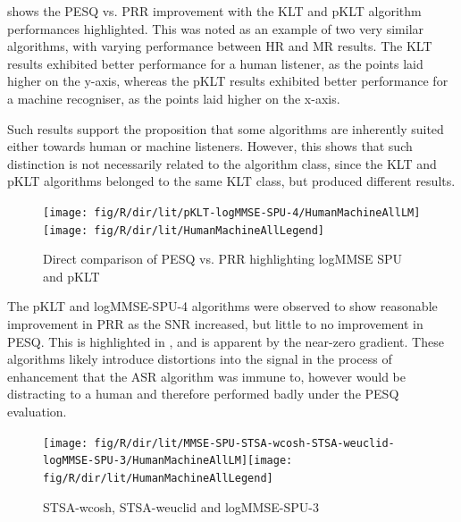  shows the \ac{PESQ} vs. \ac{PRR} improvement
with the \ac{KLT} and \ac{pKLT} algorithm performances highlighted.
This was noted as an example of two very similar algorithms, with
varying performance between \ac{HR} and \ac{MR} results. The \ac{KLT}
results exhibited better performance for a human listener, as the
points laid higher on the y-axis, whereas the \ac{pKLT} results exhibited
better performance for a machine recogniser, as the points laid higher
on the x-axis.

Such results support the proposition that some algorithms are inherently
suited either towards human or machine listeners. However, this shows
that such distinction is not necessarily related to the algorithm
class, since the \ac{KLT} and \ac{pKLT} algorithms belonged to the
same \ac{KLT} class, but produced different results.

\begin{figure}[h]
\noindent \begin{centering}
\texttt{[image: fig/R/dir/lit/pKLT-logMMSE-SPU-4/HumanMachineAllLM]}\texttt{[image: fig/R/dir/lit/HumanMachineAllLegend]}
\par\end{centering}

\protect\caption{\label{fig:direct-pklt-logmmse-spu-4}Direct comparison of \acs{PESQ}
vs. \acs{PRR} highlighting \acs{logMMSE} \acs{SPU} and \acs{pKLT}}
\end{figure}


The \ac{pKLT} and \ac{logMMSE-SPU-4} algorithms were observed to
show reasonable improvement in \ac{PRR} as the \ac{SNR} increased,
but little to no improvement in \ac{PESQ}. This is highlighted in
, and is apparent by the near-zero
gradient. These algorithms likely introduce distortions into the signal
in the process of enhancement that the \ac{ASR} algorithm was immune
to, however would be distracting to a human and therefore performed
badly under the \ac{PESQ} evaluation.

\begin{figure}[h]
\noindent \begin{centering}
\texttt{[image: fig/R/dir/lit/MMSE-SPU-STSA-wcosh-STSA-weuclid-logMMSE-SPU-3/HumanMachineAllLM]}\texttt{[image: fig/R/dir/lit/HumanMachineAllLegend]}
\par\end{centering}

\protect\caption{\label{fig:direct-highcorr}\acs{STSA-wcosh}, \acs{STSA-weuclid}
and \acs{logMMSE-SPU-3}}
\end{figure}


